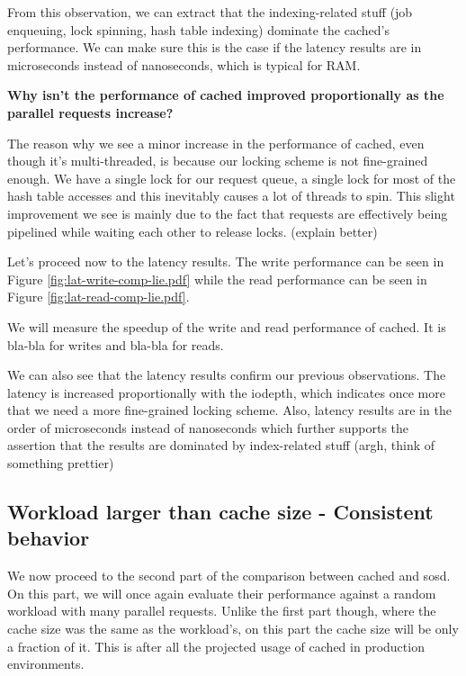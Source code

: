 From this observation, we can extract that the indexing-related stuff (job 
enqueuing, lock spinning, hash table indexing) dominate the cached's 
performance. We can make sure this is the case if the latency results are in
microseconds instead of nanoseconds, which is typical for RAM.

\textbf{Why isn't the performance of cached improved proportionally as the 
	parallel requests increase?}

The reason why we see a minor increase in the performance of cached, even 
though it's multi-threaded, is because our locking scheme is not fine-grained 
enough. We have a single lock for our request queue, a single lock for most of 
the hash table accesses and this inevitably causes a lot of threads to spin.  
This slight improvement we see is mainly due to the fact that requests are 
effectively being pipelined while waiting each other to release locks. (explain 
better)

Let's proceed now to the latency results. The write performance can be seen in 
Figure \ref{fig:lat-write-comp-lie.pdf} while the read performance can be seen 
in Figure \ref{fig:lat-read-comp-lie.pdf}.


We will measure the speedup of the write and read performance of cached. It is 
bla-bla for writes and bla-bla for reads.

We can also see that the latency results confirm our previous observations. The 
latency is increased proportionally with the iodepth, which indicates once more 
that we need a more fine-grained locking scheme. Also, latency results are in 
the order of microseconds instead of nanoseconds which further supports the 
assertion that the results are dominated by index-related stuff (argh, think of 
something prettier)

\subsection{Workload larger than cache size - Consistent behavior}

We now proceed to the second part of the comparison between cached and sosd.  
On this part, we will once again evaluate their performance against a random 
workload with many parallel requests. Unlike the first part though, where the 
cache size was the same as the workload's, on this part the cache size will be 
only a fraction of it. This is after all the projected usage of cached in
production environments.


